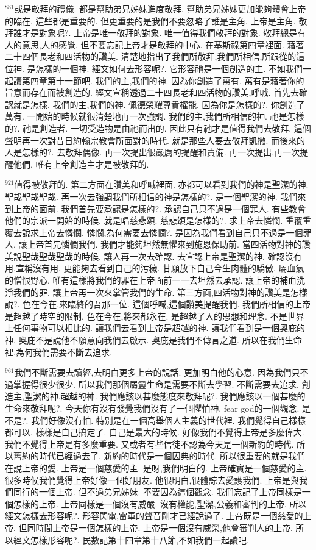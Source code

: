 \documentclass{book}
\begin{document}
$^{881}$或是敬拜的禮儀.
都是幫助弟兄姊妹進度敬拜.
幫助弟兄姊妹更加能夠體會上帝的臨在.
這些都是重要的.
但更重要的是我們不要忽略了誰是主角.
上帝是主角.
敬拜誰才是對象呢?.
上帝是唯一敬拜的對象.
唯一值得我們敬拜的對象.
敬拜總是有人的意思,人的感覺.
但不要忘記上帝才是敬拜的中心.
在基斯祿第四章裡面.
藉著二十四個長老和四活物的讚美.
清楚地指出了我們所敬拜,我們所相信,所跟從的這位神.
是怎樣的一個神.
經文如何去形容呢?.
它形容祂是一個創造的主.
不如我們一起讀第四章第十一節吧.
我們的主,我們的神.
因為你創造了萬有.
萬有是藉著你的旨意而存在而被創造的.
經文宣稱透過二十四長老和四活物的讚美,呼喊.
首先去確認就是怎樣.
我們的主,我們的神.
佩德榮耀尊貴權能.
因為你是怎樣的?.
你創造了萬有.
一開始的時候就很清楚地再一次強調.
我們的主,我們所相信的神.
祂是怎樣的?.
祂是創造者.
一切受造物是由祂而出的.
因此只有祂才是值得我們去敬拜.
這個聲明再一次對昔日約翰宗教會所面對的時代.
就是那些人要去敬拜凱撒.
而後來的人是怎樣的?.
去敬拜偶像.
再一次提出很嚴厲的提醒和責備.
再一次提出,再一次提醒他們.
唯有上帝創造主才是被敬拜的.

$^{921}$值得被敬拜的.
第二方面在讚美和呼喊裡面.
亦都可以看到我們的神是聖潔的神.
聖哉聖哉聖哉.
再一次去強調我們所相信的神是怎樣的?.
是一個聖潔的神.
我們來到上帝的面前.
我們首先要承認是怎樣的?.
承認自己只不過是一個罪人.
有些教會他們的宗派一開始的時候.
就是唱慈悲頌.
慈悲頌是怎樣的?.
求上帝去憐憫.
重覆重覆去說求上帝去憐憫.
憐憫,為何需要去憐憫?.
是因為我們看到自己只不過是一個罪人.
讓上帝首先憐憫我們.
我們才能夠坦然無懼來到施恩保助前.
當四活物對神的讚美說聖哉聖哉聖哉的時候.
讓人再一次去確認.
去宣認上帝是聖潔的神.
確認沒有用,宣稱沒有用.
更能夠去看到自己的污穢.
甘願放下自己今生肉體的驕傲.
屬血氣的憎恨野心.
唯有這樣將我們的罪在上帝面前一一去坦然去承認.
讓上帝的補血洗淨我們的罪.
讓上帝再一次來掌管我們的生命.
第三方面,四活物對神的讚美是怎樣說?.
色在今在,來臨終的吾那一位.
這個呼喊,這個讚美提醒我們.
我們所相信的上帝是超越了時空的限制.
色在今在,將來都永在.
是超越了人的思想和理念.
不是世界上任何事物可以相比的.
讓我們去看到上帝是超越的神.
讓我們看到是一個奧庇的神.
奧庇不是說他不願意向我們去啟示.
奧庇是我們不傳言之道.
所以在我們生命裡,為何我們需要不斷去追求.

$^{961}$我們不斷需要去讀經,去明白更多上帝的說話.
更加明白他的心意.
因為我們只不過掌握得很少很少.
所以我們那個屬靈生命是需要不斷去學習.
不斷需要去追求.
創造主,聖潔的神,超越的神.
我們應該以甚麼態度來敬拜呢?.
我們應該以一個甚麼的生命來敬拜呢?.
今天你有沒有發覺我們沒有了一個懼怕神.
fear god的一個觀念.
是不是?.
我們好像沒有怕.
特別是在一個高舉個人主義的世代裡.
我們覺得自己樣樣都可以.
樣樣是自己搞定了.
自己是最大的時候.
好像我們不覺得上帝是多麼偉大.
我們不覺得上帝是有多麼重要.
又或者有些信徒不認為今天是一個新約的時代.
所以舊約的時代已經過去了.
新約的時代是一個因典的時代.
所以很重要的就是我們在說上帝的愛.
上帝是一個慈愛的主.
是呀,我們明白的.
上帝確實是一個慈愛的主.
很多時候我們覺得上帝好像一個好朋友.
他很明白,很體諒去愛護我們.
上帝是與我們同行的一個上帝.
但不過弟兄姊妹.
不要因為這個觀念.
我們忘記了上帝同樣是一個怎樣的上帝.
上帝同樣是一個沒有威嚴.
沒有權能,聖潔,公義和審判的上帝.
所以經文怎樣去形容呢?.
形容閃電,雷軍的聲音剛才已經說過了.
上帝既是一個慈愛的上帝.
但同時間上帝是一個怎樣的上帝.
上帝是一個沒有威榮,他會審判人的上帝.
所以經文怎樣形容呢?.
民數記第十四章第十八節,不如我們一起讀吧.
\end{document}
